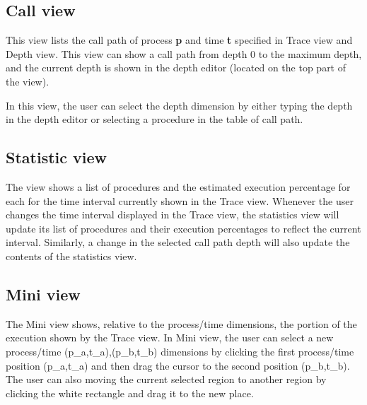 \documentclass[english]{article}
\begin{document}
\subsection{Call view}

This view lists the call path of process \textbf{p} and time \textbf{t} specified in Trace view and Depth view.
This view can show a call path from depth $0$ to the maximum depth, and the current depth is shown in the depth editor (located on the top part of the view).

In this view, the user can select the depth dimension by either typing the depth in the depth editor or selecting a procedure in the table of call path.


\subsection{Statistic view}

The view shows a list of procedures and the estimated execution percentage for each for the time interval currently shown in the Trace view. 
  Whenever the user changes the time interval displayed in the Trace view, the statistics view will update its list of procedures and their execution percentages to 
  reflect the current interval.  Similarly, a change in the selected call path depth will also update the contents of the statistics view.


\subsection{Mini view}

The Mini view shows, relative to the process/time dimensions, the portion of the execution shown by the Trace view.
In Mini view, the user can select a new process/time (p_a,t_a),(p_b,t_b) dimensions by clicking the first process/time position (p_a,t_a) and then drag the cursor to the second position (p_b,t_b).
The user can also moving the current selected region to another region by clicking the white rectangle and drag it to the new place.
\end{document}
